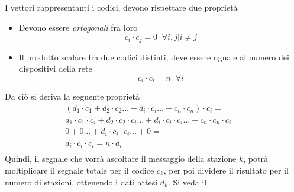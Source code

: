 \documentclass[12pt, letterpaper]{article}
\begin{document}
I vettori rappresentanti i codici, devono rispettare due proprietà\begin{itemize}
    \item Devono essere \textit{ortogonali} fra loro $$c_i\cdot c_j = 0\;\; \forall i,j | i\ne j $$
    \item Il prodotto scalare fra due codici distinti, deve essere uguale al numero dei dispositivi della rete 
    $$ c_i\cdot c_i = n\;\;\forall i $$ 
\end{itemize}
Da ciò si deriva la seguente proprietà $$\begin{matrix}
     ( d_1\cdot c_1 + d_2\cdot c_2\dots+d_i\cdot c_i\dots +c_n\cdot c_n ) \cdot c_i = \\ 
     d_1\cdot c_1\cdot c_i + d_2\cdot c_2\cdot c_i \dots+d_i\cdot c_i\cdot c_i \dots +c_n\cdot c_n\cdot c_i = \\ 
     0 + 0 \dots + d_i\cdot c_i\cdot c_i \dots + 0 =\\  d_i\cdot c_i\cdot c_i = n\cdot d_i\\
\end{matrix}$$
Quindi, il segnale che vorrà ascoltare il messaggio della stazione $k$, potrà moltiplicare il segnale totale per 
il codice $c_k$, per poi dividere il risultato per il numero di stazioni, ottenendo i dati attesi $d_k$. Si veda il 
\end{document}
